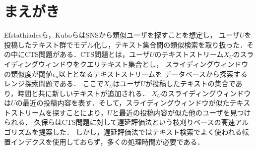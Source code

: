 \section{まえがき}


Efstathiadesら\cite{efstathiades}，Kuboら\cite{kubo}はSNSから類似ユーザを探すことを想定し，
ユーザ$U$を投稿したテキスト群でモデル化し，テキスト集合間の類似検索を取り扱った．その中にCTS問題\cite{kubo}がある．CTS問題とは，ユーザ$U$のテキストストリーム$X_U$のスライディングウィンドウをクエリテキスト集合とし，
スライディングウィンドウの類似度が閾値$\epsilon_u$以上となるテキストストリームを
データベースから探索するレンジ探索問題である．
ここで$X_U$はユーザ$U$が投稿したテキストの集合であり，時間と共に新しいテキストが追加される．
$X_U$のスライディングウィンドウは$U$の最近の投稿内容を表す．そして，スライディングウィンドウが似たテキストストリームを探すことにより，$U$と最近の投稿内容が似た他のユーザを見つけられる．
久保ら\cite{kubo}はCTS問題に対して遅延評価法という枝刈りベースの高速アルゴリズムを提案した．
しかし，遅延評価法ではテキスト検索でよく使われる転置インデクスを使用しておらず，多くの処理時間が必要である．


